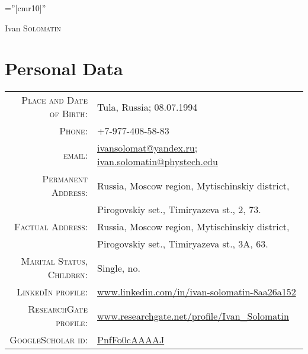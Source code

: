 \documentclass[a4paper,10pt]{article}
\begin{document}

\pagestyle{empty} %

\font\fb=''[cmr10]'' %

\par{\centering
		{\Huge Ivan \textsc{Solomatin}
	}\bigskip\par}

\section{Personal Data}

\begin{tabular}{rl}
    \textsc{Place and Date of Birth:} & Tula, Russia; 08.07.1994 \\
    \textsc{Phone:}     & +7-977-408-58-83\\
    \textsc{email:}     & \href{mailto:ivansolomat@yandex.ru}{ivansolomat@yandex.ru}; \href{mailto:ivan.solomatin@phystech.edu}{ivan.solomatin@phystech.edu}\\
    \textsc{Permanent Address:} & Russia, Moscow region, Mytischinskiy district, \\ 
                                & Pirogovskiy set., Timiryazeva st., 2, 73.	\\
    \textsc{Factual Address:} & Russia, Moscow region, Mytischinskiy district, \\
                              & Pirogovskiy set., Timiryazeva st., 3A, 63.	 \\
    \textsc{Marital Status, Children:} & Single, no.\\
    \textsc{LinkedIn profile:} & \href{https://www.linkedin.com/in/ivan-solomatin-8aa26a152}{www.linkedin.com/in/ivan-solomatin-8aa26a152}\\
    \textsc{ResearchGate profile:} & \href{https://www.researchgate.net/profile/Ivan_Solomatin}{www.researchgate.net/profile/Ivan\_Solomatin}\\
    \textsc{GoogleScholar id:} & \href{https://scholar.google.ru/citations?user=PnfFo0cAAAAJ}{PnfFo0cAAAAJ}

\end{tabular}
\end{document}
